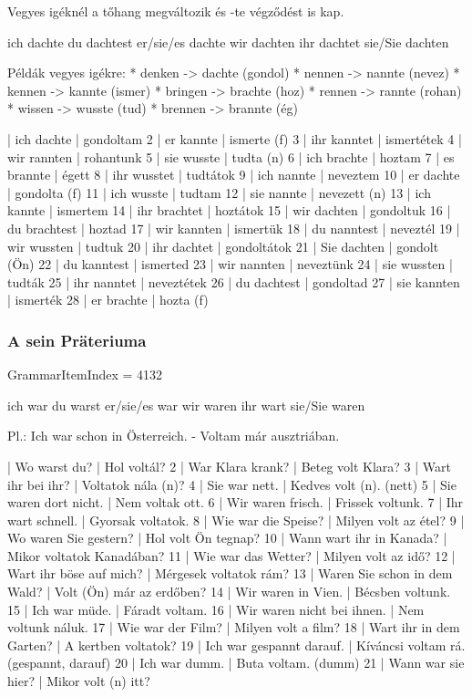 \documentclass{article}
\newenvironment{desc}{\verbatim}{\endverbatim}
\newenvironment{exmp}{\verbatim}{\endverbatim}
\begin{document}
\begin{desc}
Vegyes igéknél a tőhang megváltozik és -te végződést is kap.

ich dachte
du dachtest
er/sie/es dachte
wir dachten
ihr dachtet
sie/Sie dachten

Példák vegyes igékre:
* denken -> dachte (gondol)
* nennen -> nannte (nevez)
* kennen -> kannte (ismer)
* bringen -> brachte (hoz)
* rennen -> rannte (rohan)
* wissen -> wusste (tud)
* brennen -> brannte (ég)
\end{desc}

\begin{exmp}
1 | ich dachte | gondoltam
2 | er kannte | ismerte (f)
3 | ihr kanntet | ismertétek
4 | wir rannten | rohantunk
5 | sie wusste | tudta (n)
6 | ich brachte | hoztam
7 | es brannte | égett
8 | ihr wusstet | tudtátok
9 | ich nannte | neveztem
10 | er dachte | gondolta (f)
11 | ich wusste | tudtam
12 | sie nannte | nevezett (n)
13 | ich kannte | ismertem
14 | ihr brachtet | hoztátok
15 | wir dachten | gondoltuk
16 | du brachtest | hoztad
17 | wir kannten | ismertük
18 | du nanntest | neveztél
19 | wir wussten | tudtuk
20 | ihr dachtet | gondoltátok
21 | Sie dachten | gondolt (Ön)
22 | du kanntest | ismerted
23 | wir nannten | neveztünk
24 | sie wussten | tudták
25 | ihr nanntet | neveztétek
26 | du dachtest | gondoltad
27 | sie kannten | ismerték
28 | er brachte | hozta (f)
\end{exmp}

\subsubsection{A sein Präteriuma}

GrammarItemIndex = 4132

\begin{desc}
ich war
du warst
er/sie/es war
wir waren
ihr wart
sie/Sie waren

Pl.: Ich war schon in Österreich. - Voltam már ausztriában.
\end{desc}

\begin{exmp}
1 | Wo warst du? | Hol voltál?
2 | War Klara krank? | Beteg volt Klara?
3 | Wart ihr bei ihr? | Voltatok nála (n)?
4 | Sie war nett. | Kedves volt (n). (nett)
5 | Sie waren dort nicht. | Nem voltak ott.
6 | Wir waren frisch. | Frissek voltunk.
7 | Ihr wart schnell. | Gyorsak voltatok.
8 | Wie war die Speise? | Milyen volt az étel?
9 | Wo waren Sie gestern? | Hol volt Ön tegnap?
10 | Wann wart ihr in Kanada? | Mikor voltatok Kanadában?
11 | Wie war das Wetter? | Milyen volt az idő?
12 | Wart ihr böse auf mich? | Mérgesek voltatok rám?
13 | Waren Sie schon in dem Wald? | Volt (Ön) már az erdőben?
14 | Wir waren in Vien. | Bécsben voltunk.
15 | Ich war müde. | Fáradt voltam.
16 | Wir waren nicht bei ihnen. | Nem voltunk náluk.
17 | Wie war der Film? | Milyen volt a film?
18 | Wart ihr in dem Garten? | A kertben voltatok?
19 | Ich war gespannt darauf. | Kíváncsi voltam rá. (gespannt, darauf)
20 | Ich war dumm. | Buta voltam. (dumm)
21 | Wann war sie hier? | Mikor volt (n) itt?
\end{exmp}
\end{document}
